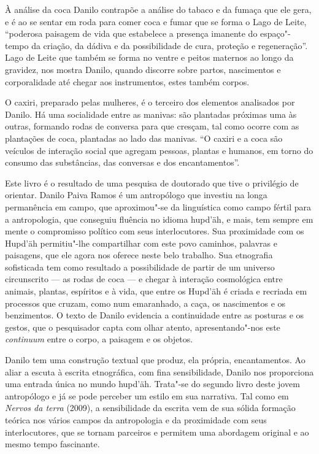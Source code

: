 À análise da coca Danilo contrapõe a análise do tabaco e da fumaça que
ele gera, e é ao se sentar em roda para comer coca e fumar que se forma
o Lago de Leite, ``poderosa paisagem de vida que estabelece a presença
imanente do espaço"-tempo da criação, da dádiva e da possibilidade de
cura, proteção e regeneração''. Lago de Leite que também se forma no
ventre e peitos maternos ao longo da gravidez, nos mostra Danilo, quando
discorre sobre partos, nascimentos e corporalidade até chegar aos
instrumentos, estes também corpos.

O caxiri, preparado pelas mulheres, é o terceiro dos elementos
analisados por Danilo. Há uma socialidade entre as manivas: são
plantadas próximas uma às outras, formando rodas de conversa para que
cresçam, tal como ocorre com as plantações de coca, plantadas ao lado
das manivas. ``O caxiri e a coca são veículos de interação social que
agregam pessoas, plantas e humanos, em torno do consumo das substâncias,
das conversas e dos encantamentos''.

Este livro é o resultado de uma pesquisa de doutorado que tive o
privilégio de orientar. Danilo Paiva Ramos é um antropólogo que investiu
na longa permanência em campo, que aproximou"-se da linguística como
campo fértil para a antropologia, que conseguiu fluência no idioma
hupd'äh, e mais, tem sempre em mente o compromisso político com seus
interlocutores. Sua proximidade com os Hupd'äh permitiu"-lhe compartilhar
com este povo caminhos, palavras e paisagens, que ele agora nos oferece
neste belo trabalho. Sua etnografia sofisticada tem como resultado a
possibilidade de partir de um universo circunscrito --- as rodas de coca
--- e chegar à interação cosmológica entre animais, plantas, espíritos e
à vida, que entre os Hupd'äh é criada e recriada em processos que
cruzam, como num emaranhado, a caça, os nascimentos e os benzimentos. O
texto de Danilo evidencia a continuidade entre as posturas e os gestos,
que o pesquisador capta com olhar atento, apresentando"-nos este
\textit{continuum} entre o corpo, a paisagem e os objetos.

Danilo tem uma construção textual que produz, ela própria,
encantamentos. Ao aliar a escuta à escrita etnográfica, com fina
sensibilidade, Danilo nos proporciona uma entrada única no mundo
hupd'äh. Trata"-se do segundo livro deste jovem antropólogo e já se pode
perceber um estilo em sua narrativa. Tal como em \textit{Nervos da terra}
(2009), a sensibilidade da escrita vem de sua sólida formação
teórica nos vários campos da antropologia e da proximidade com seus
interlocutores, que se tornam parceiros e permitem uma abordagem
original e ao mesmo tempo fascinante.
